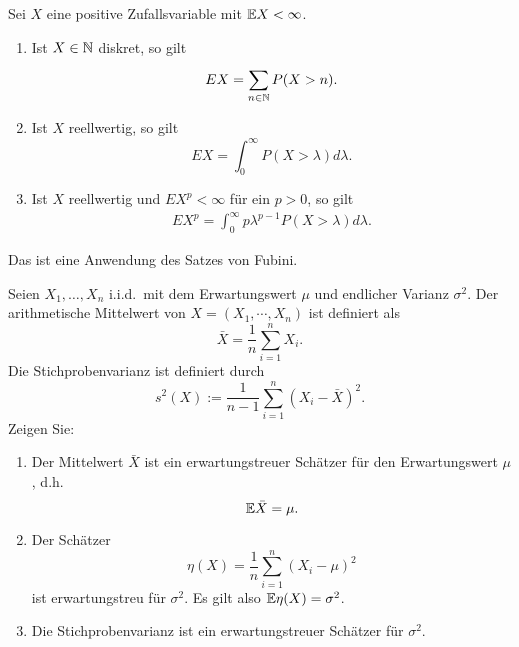  Sei $X$ eine
positive Zufallsvariable mit $\mathbb{E} X < \infty$. 
\begin{enumerate}
    \item Ist $X \in \mathbb N$ diskret, so gilt
        \begin{equation}
            E X = \sum_{n\in\mathbb N}^{} P(X>n).
        \end{equation}
    \item Ist $X$ reellwertig, so gilt
        \begin{equation}
            E X = \int_{0}^{\infty} P(X>\lambda) d\lambda.
        \end{equation}
    \item Ist $X$ reellwertig und $E X^p<\infty$ für ein $p>0$, so gilt
        \begin{eqnarray}
            E X^p = \int_{0}^{\infty} p\lambda^{p-1} P(X>\lambda) d\lambda.
        \end{eqnarray}
\end{enumerate} 

\solution Das ist eine Anwendung des Satzes von Fubini.

Seien $X_1,\ldots,X_n$ i.i.d.\ mit dem Erwartungswert $\mu$ und endlicher
Varianz $\sigma^2$. Der arithmetische Mittelwert von $X=(X_1,\cdots,X_n)$ ist
definiert als
\begin{equation*}
    \bar X = \frac{1}{n} \sum_{i=1}^{n} X_i. 
\end{equation*}
Die Stichprobenvarianz ist definiert durch
\begin{equation*}
    s^2(X) := \frac{1}{n-1} \sum_{i=1}^{n} (X_i - \bar X)^2.
\end{equation*}
Zeigen Sie: 
\begin{enumerate}
    \item Der Mittelwert $\bar X$ ist ein erwartungstreuer Schätzer für den
        Erwartungswert $\mu$, d.h.\ 
        \begin{equation*}
            \mathbb{E} \bar X = \mu. 
        \end{equation*}
    \item Der Schätzer
        \begin{equation*}
            \eta(X) = \frac{1}{n} \sum_{i=1}^{n} \left( X_i - \mu \right)^2
        \end{equation*}
        ist erwartungstreu für $\sigma^2$. Es gilt also $\mathbb{E} \eta(X) = \sigma^2$.  
    \item Die Stichprobenvarianz ist ein erwartungstreuer Schätzer für $\sigma^2$. 
\end{enumerate}


